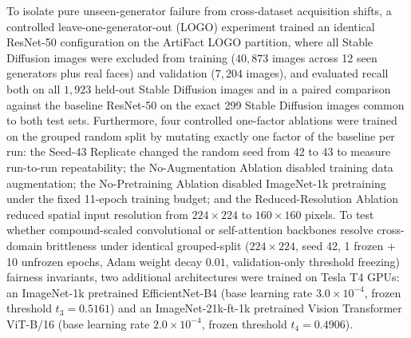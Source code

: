\documentclass[final,5p,times,twocolumn,numafflabel]{elsarticle}
\begin{document}
To isolate pure unseen-generator failure from cross-dataset acquisition shifts, a controlled leave-one-generator-out (LOGO) experiment trained an identical ResNet-50 configuration on the ArtiFact LOGO partition, where all Stable Diffusion images were excluded from training ($40{,}873$ images across 12 seen generators plus real faces) and validation ($7{,}204$ images), and evaluated recall both on all $1{,}923$ held-out Stable Diffusion images and in a paired comparison against the baseline ResNet-50 on the exact 299 Stable Diffusion images common to both test sets. Furthermore, four controlled one-factor ablations were trained on the grouped random split by mutating exactly one factor of the baseline per run: the Seed-43 Replicate changed the random seed from 42 to 43 to measure run-to-run repeatability; the No-Augmentation Ablation disabled training data augmentation; the No-Pretraining Ablation disabled ImageNet-1k pretraining under the fixed 11-epoch training budget; and the Reduced-Resolution Ablation reduced spatial input resolution from $224\times 224$ to $160\times 160$ pixels. To test whether compound-scaled convolutional or self-attention backbones resolve cross-domain brittleness under identical grouped-split ($224\times 224$, seed 42, 1 frozen + 10 unfrozen epochs, Adam weight decay $0.01$, validation-only threshold freezing) fairness invariants, two additional architectures were trained on Tesla T4 GPUs: an ImageNet-1k pretrained EfficientNet-B4 (base learning rate $3.0\times 10^{-4}$, frozen threshold $t_3 = 0.5161$) and an ImageNet-21k-ft-1k pretrained Vision Transformer ViT-B/16 (base learning rate $2.0\times 10^{-4}$, frozen threshold $t_4 = 0.4906$).
\end{document}

